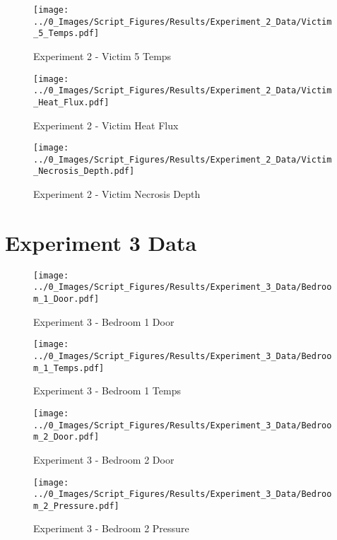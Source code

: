 	\clearpage

	\begin{figure}[H]
		\centering
		\texttt{[image: ../0\_Images/Script\_Figures/Results/Experiment\_2\_Data/Victim\_5\_Temps.pdf]}
		\caption[]{Experiment 2 - Victim 5 Temps}
	\end{figure}
 

	\begin{figure}[H]
		\centering
		\texttt{[image: ../0\_Images/Script\_Figures/Results/Experiment\_2\_Data/Victim\_Heat\_Flux.pdf]}
		\caption[]{Experiment 2 - Victim Heat Flux}
	\end{figure}
 
	\clearpage

	\begin{figure}[H]
		\centering
		\texttt{[image: ../0\_Images/Script\_Figures/Results/Experiment\_2\_Data/Victim\_Necrosis\_Depth.pdf]}
		\caption[]{Experiment 2 - Victim Necrosis Depth}
	\end{figure}
 

\clearpage		\large
\section{Experiment 3 Data} \label{App:Exp3Results} 

	\begin{figure}[H]
		\centering
		\texttt{[image: ../0\_Images/Script\_Figures/Results/Experiment\_3\_Data/Bedroom\_1\_Door.pdf]}
		\caption[]{Experiment 3 - Bedroom 1 Door}
	\end{figure}
 

	\begin{figure}[H]
		\centering
		\texttt{[image: ../0\_Images/Script\_Figures/Results/Experiment\_3\_Data/Bedroom\_1\_Temps.pdf]}
		\caption[]{Experiment 3 - Bedroom 1 Temps}
	\end{figure}
 
	\clearpage

	\begin{figure}[H]
		\centering
		\texttt{[image: ../0\_Images/Script\_Figures/Results/Experiment\_3\_Data/Bedroom\_2\_Door.pdf]}
		\caption[]{Experiment 3 - Bedroom 2 Door}
	\end{figure}
 

	\begin{figure}[H]
		\centering
		\texttt{[image: ../0\_Images/Script\_Figures/Results/Experiment\_3\_Data/Bedroom\_2\_Pressure.pdf]}
		\caption[]{Experiment 3 - Bedroom 2 Pressure}
	\end{figure}
 
